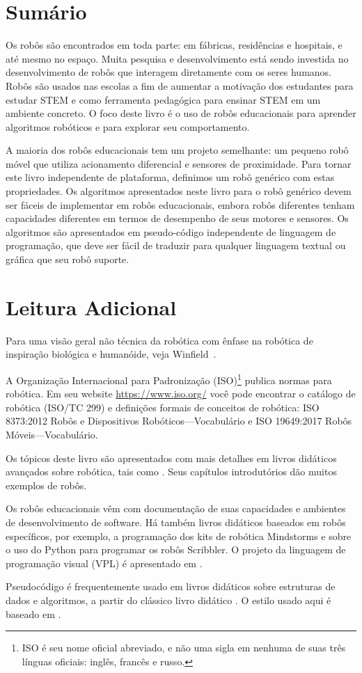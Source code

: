 \section{Sumário}

Os robôs são encontrados em toda parte: em fábricas, residências e hospitais, e até mesmo no espaço. Muita pesquisa e desenvolvimento está sendo investida no desenvolvimento de robôs que interagem diretamente com os seres humanos. Robôs são usados nas escolas a fim de aumentar a motivação dos estudantes para estudar STEM e como ferramenta pedagógica para ensinar STEM em um ambiente concreto. O foco deste livro é o uso de robôs educacionais para aprender algoritmos robóticos e para explorar seu comportamento.

A maioria dos robôs educacionais tem um projeto semelhante: um pequeno robô móvel que utiliza acionamento diferencial e sensores de proximidade. Para tornar este livro independente de plataforma, definimos um robô genérico com estas propriedades. Os algoritmos apresentados neste livro para o robô genérico devem ser fáceis de implementar em robôs educacionais, embora robôs diferentes tenham capacidades diferentes em termos de desempenho de seus motores e sensores. Os algoritmos são apresentados em pseudo-código independente de linguagem de programação, que deve ser fácil de traduzir para qualquer linguagem textual ou gráfica que seu robô suporte.

\section{Leitura Adicional}

Para uma visão geral não técnica da robótica com ênfase na robótica de inspiração biológica e humanóide, veja Winfield~\cite{vsi}.

A Organização Internacional para Padronização (ISO)\footnote{ISO é seu nome oficial abreviado, e não uma sigla em nenhuma de suas três línguas oficiais: inglês, francês e russo.} publica normas para robótica. Em seu website \url{https://www.iso.org/} você pode encontrar o catálogo de robótica (ISO/TC 299) e definições formais de conceitos de robótica: ISO 8373:2012 Robôs e Dispositivos Robóticos---Vocabulário e ISO 19649:2017 Robôs Móveis---Vocabulário.

Os tópicos deste livro são apresentados com mais detalhes em livros didáticos avançados sobre robótica, tais como \cite{dudek,siegwart}. Seus capítulos introdutórios dão muitos exemplos de robôs.

Os robôs educacionais vêm com documentação de suas capacidades e ambientes de desenvolvimento de software. Há também livros didáticos baseados em robôs específicos, por exemplo, \cite{trobaugh} a programação dos kits de robótica \lego{} Mindstorms e \cite{kumar} sobre o uso do Python para programar os robôs Scribbler. O projeto da linguagem de programação visual (VPL) é apresentado em \cite{shin2014idc}.

Pseudocódigo é frequentemente usado em livros didáticos sobre estruturas de dados e algoritmos, a partir do clássico livro didático \cite{aho}. O estilo usado aqui é baseado em \cite{pcdp2}.


